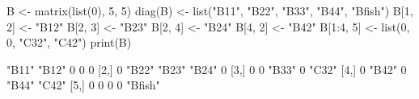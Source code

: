 \begin{Schunk}
\begin{Sinput}
 B <- matrix(list(0), 5, 5)
 diag(B) <- list("B11", "B22", "B33", "B44", "Bfish")
 B[1, 2] <- "B12"
 B[2, 3] <- "B23"
 B[2, 4] <- "B24"
 B[4, 2] <- "B42"
 B[1:4, 5] <- list(0, 0, "C32", "C42")
 print(B)
\end{Sinput}
\begin{Soutput}
     [,1]  [,2]  [,3]  [,4]  [,5]   
[1,] "B11" "B12" 0     0     0      
[2,] 0     "B22" "B23" "B24" 0      
[3,] 0     0     "B33" 0     "C32"  
[4,] 0     "B42" 0     "B44" "C42"  
[5,] 0     0     0     0     "Bfish"
\end{Soutput}
\end{Schunk}
